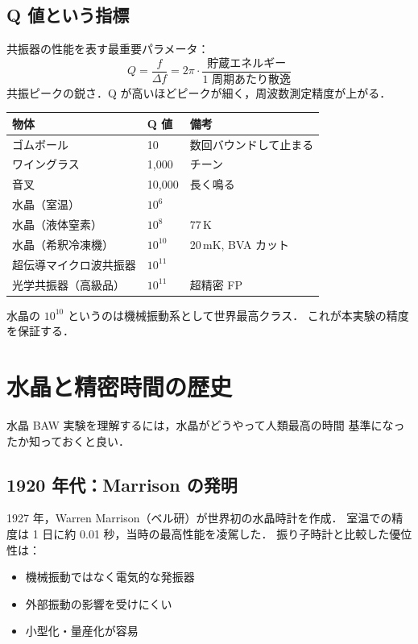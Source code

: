 \documentclass[11pt,a4paper]{article}
\begin{document}
\subsection{Q 値という指標}

共振器の性能を表す最重要パラメータ：
\begin{equation}
Q = \frac{f}{\Delta f} = 2\pi \cdot \frac{\text{貯蔵エネルギー}}{\text{1 周期あたり散逸}}
\end{equation}
共振ピークの鋭さ．Q が高いほどピークが細く，周波数測定精度が上がる．

\begin{center}
\begin{tabular}{lll}
\toprule
物体 & Q 値 & 備考 \\
\midrule
ゴムボール & 10 & 数回バウンドして止まる \\
ワイングラス & 1,000 & チーン\\
音叉 & 10,000 & 長く鳴る \\
水晶（室温） & $10^6$ & \\
水晶（液体窒素）& $10^8$ & 77\,K \\
水晶（希釈冷凍機）& $10^{10}$ & 20\,mK, BVA カット \\
超伝導マイクロ波共振器 & $10^{11}$ & \\
光学共振器（高級品）& $10^{11}$ & 超精密 FP \\
\bottomrule
\end{tabular}
\end{center}

水晶の $10^{10}$ というのは機械振動系として世界最高クラス．
これが本実験の精度を保証する．

\section{水晶と精密時間の歴史}

水晶 BAW 実験を理解するには，水晶がどうやって人類最高の時間
基準になったか知っておくと良い．

\subsection{1920 年代：Marrison の発明}

1927 年，Warren Marrison（ベル研）が世界初の水晶時計を作成．
室温での精度は 1 日に約 0.01 秒，当時の最高性能を凌駕した．
振り子時計と比較した優位性は：
\begin{itemize}
\item 機械振動ではなく電気的な発振器
\item 外部振動の影響を受けにくい
\item 小型化・量産化が容易
\end{itemize}
\end{document}

